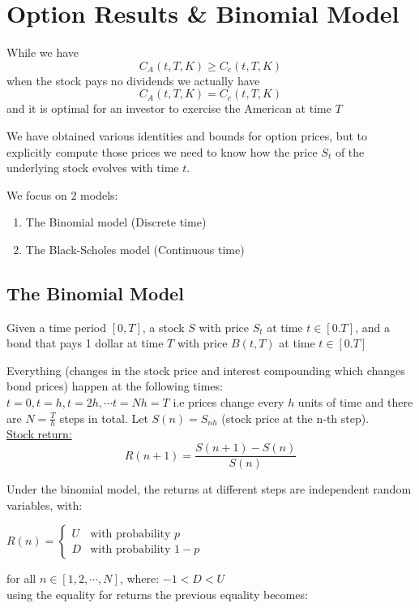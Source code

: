 \documentclass[oneside]{book}
\begin{document}
\section{Option Results \& Binomial Model}
While we have
$$
C_A(t, T, K) \geq C_e(t, T, K)
$$
when the stock pays no dividends we actually have
$$
C_A(t, T, K) = C_e(t, T, K)
$$
and it is optimal for an investor to exercise the American at time $T$

We have obtained various identities and bounds for option prices, but to explicitly
compute those prices we need to know how the price $S_t$ of the underlying stock
evolves with time $t$.

We focus on $2$ models:
\begin{enumerate}
    \item The Binomial model (Discrete time)
    \item The Black-Scholes model (Continuous time)
\end{enumerate}

\subsection{The Binomial Model}
Given a time period $[0, T]$, a stock $S$ with price $S_t$ at time $t \in [0.T]$, and
a bond that pays 1 dollar at time $T$ with price $B(t, T)$ at time $t \in [0.T]$

Everything (changes in the stock price and interest compounding which changes bond
prices) happen at the following times: \\

$t = 0, t = h, t = 2h, \cdots t = Nh = T$ i.e prices change every $h$ units of time
and there are $N = \frac{T}{h}$ steps in total. Let $S(n) = S_{nh}$ (stock price
at the n-th step). \\

\underline{Stock return:}
$$
    R(n+1) = \frac{S(n+1) - S(n)}{S(n)}
$$

Under the binomial model, the returns at different steps are independent random
variables, with:

$R(n)=
\begin{cases}
U & \text{with probability } p\\
D  & \text{with probability } 1-p
\end{cases}$

for all $n \in [1, 2, \cdots, N]$, where: $-1 < D < U$ \\

using the equality for returns the previous equality becomes:
\end{document}
